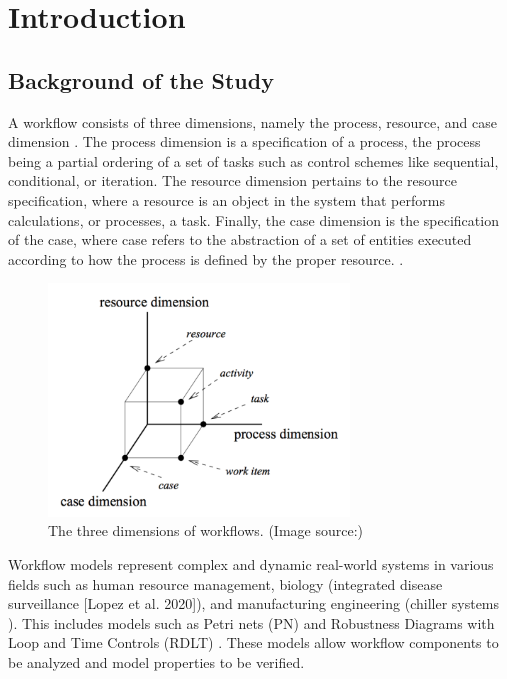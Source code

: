 \chapter{Introduction}\label{chap:intro}
\section{Background of the Study}
\indent A workflow consists of three dimensions, namely the process, resource, and case dimension \cite{hollingsworth}.  The process dimension is a specification of a process, the process being a partial ordering of a set of tasks such as control schemes like sequential, conditional, or iteration. The resource dimension pertains to the resource specification, where a resource is an object in the system that performs calculations, or processes, a task. Finally, the case dimension is the specification of the case, where case refers to the abstraction of a set of entities executed according to how the process is defined by the proper resource. \cite{Aalst1996} \cite{Malinao2017}.\\
\begin{figure}[]
    \centering
    \includegraphics[width=8cm]{../Figures/Workflow Dimensions.png}
    \caption{The three dimensions of workflows. (Image source:\cite{Malinao2017})}
    \label{WorkflowDimensions} 
\end{figure}
\indent Workflow models represent complex and dynamic real-world systems in various fields such as human resource management,  biology (integrated disease surveillance [Lopez et al. 2020]),  and manufacturing engineering (chiller systems \cite{Ramirez2024}). This includes models such as Petri nets (PN) and Robustness Diagrams with Loop and Time Controls (RDLT) \cite{Malinao2017}. These models allow workflow components to be analyzed and model properties to be verified. \\

